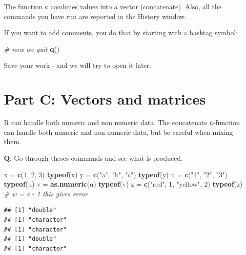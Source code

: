 \documentclass[]{article}
\newenvironment{Shaded}{\begin{snugshade}}{\end{snugshade}}
\newcommand{\KeywordTok}[1]{\textcolor[rgb]{0.13,0.29,0.53}{\textbf{#1}}}
\newcommand{\DecValTok}[1]{\textcolor[rgb]{0.00,0.00,0.81}{#1}}
\newcommand{\StringTok}[1]{\textcolor[rgb]{0.31,0.60,0.02}{#1}}
\newcommand{\CommentTok}[1]{\textcolor[rgb]{0.56,0.35,0.01}{\textit{#1}}}
\newcommand{\NormalTok}[1]{#1}
\begin{document}
The function \texttt{c} combines values into a vector (concatenate).
Also, all the commands you have run are reported in the History window.

If you want to add comments, you do that by starting with a hashtag
symbol:

\begin{Shaded}
\begin{Highlighting}[]
\CommentTok{# now we quit}
\KeywordTok{q}\NormalTok{()}
\end{Highlighting}
\end{Shaded}

Save your work - and we will try to open it later.

\section{Part C: Vectors and
matrices}\label{part-c-vectors-and-matrices}

R can handle both numeric and non numeric data. The concatenate
\texttt{c}-function can handle both numeric and non-numeric data, but be
careful when mixing them.

\textbf{Q}: Go through theses commands and see what is produced.

\begin{Shaded}
\begin{Highlighting}[]
\NormalTok{x =}\StringTok{ }\KeywordTok{c}\NormalTok{(}\DecValTok{1}\NormalTok{, }\DecValTok{2}\NormalTok{, }\DecValTok{3}\NormalTok{)}
\KeywordTok{typeof}\NormalTok{(x)}
\NormalTok{y =}\StringTok{ }\KeywordTok{c}\NormalTok{(}\StringTok{"a"}\NormalTok{, }\StringTok{"b"}\NormalTok{, }\StringTok{"c"}\NormalTok{)}
\KeywordTok{typeof}\NormalTok{(y)}
\NormalTok{u =}\StringTok{ }\KeywordTok{c}\NormalTok{(}\StringTok{"1"}\NormalTok{, }\StringTok{"2"}\NormalTok{, }\StringTok{"3"}\NormalTok{)}
\KeywordTok{typeof}\NormalTok{(u)}
\NormalTok{v =}\StringTok{ }\KeywordTok{as.numeric}\NormalTok{(u)}
\KeywordTok{typeof}\NormalTok{(v)}
\NormalTok{z =}\StringTok{ }\KeywordTok{c}\NormalTok{(}\StringTok{"red"}\NormalTok{, }\DecValTok{1}\NormalTok{, }\StringTok{"yellow"}\NormalTok{, }\DecValTok{2}\NormalTok{)}
\KeywordTok{typeof}\NormalTok{(z)}
\CommentTok{# w = z - 1 this gives error}
\end{Highlighting}
\end{Shaded}

\begin{verbatim}
## [1] "double"
## [1] "character"
## [1] "character"
## [1] "double"
## [1] "character"
\end{verbatim}
\end{document}
